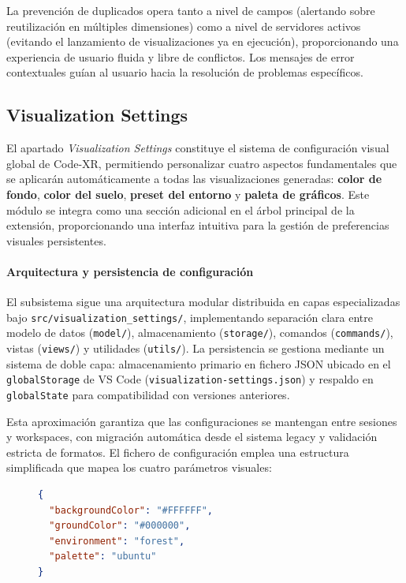 \documentclass[a4paper, 12pt]{book}
\begin{document}
La prevención de duplicados opera tanto a nivel de campos (alertando sobre reutilización en múltiples dimensiones) como a nivel de servidores activos (evitando el lanzamiento de visualizaciones ya en ejecución), proporcionando una experiencia de usuario fluida y libre de conflictos. Los mensajes de error contextuales guían al usuario hacia la resolución de problemas específicos.



\subsection{Visualization Settings}
\label{sec:visualization-settings}

El apartado \emph{Visualization Settings} constituye el sistema de configuración visual global de Code-XR, permitiendo personalizar cuatro aspectos fundamentales que se aplicarán automáticamente a todas las visualizaciones generadas: \textbf{color de fondo}, \textbf{color del suelo}, \textbf{preset del entorno} y \textbf{paleta de gráficos}. Este módulo se integra como una sección adicional en el árbol principal de la extensión, proporcionando una interfaz intuitiva para la gestión de preferencias visuales persistentes.

\paragraph{Arquitectura y persistencia de configuración}
El subsistema sigue una arquitectura modular distribuida en capas especializadas bajo \texttt{src/visualization\_settings/}, implementando separación clara entre modelo de datos (\texttt{model/}), almacenamiento (\texttt{storage/}), comandos (\texttt{commands/}), vistas (\texttt{views/}) y utilidades (\texttt{utils/}). La persistencia se gestiona mediante un sistema de doble capa: almacenamiento primario en fichero JSON ubicado en el \texttt{globalStorage} de VS Code (\texttt{visualization-settings.json}) y respaldo en \texttt{globalState} para compatibilidad con versiones anteriores.

Esta aproximación garantiza que las configuraciones se mantengan entre sesiones y workspaces, con migración automática desde el sistema legacy y validación estricta de formatos. El fichero de configuración emplea una estructura simplificada que mapea los cuatro parámetros visuales:

\begin{figure}[H]
\centering
\begin{minipage}{0.9\linewidth}
\begin{lstlisting}[language=json,
caption={Estructura del archivo \texttt{visualization-settings.json} que persiste las preferencias visuales globales.},
label={fig:visualization-settings-json}]
{
  "backgroundColor": "#FFFFFF",
  "groundColor": "#000000",
  "environment": "forest", 
  "palette": "ubuntu"
}
\end{lstlisting}
\end{minipage}
\end{figure}
\end{document}

